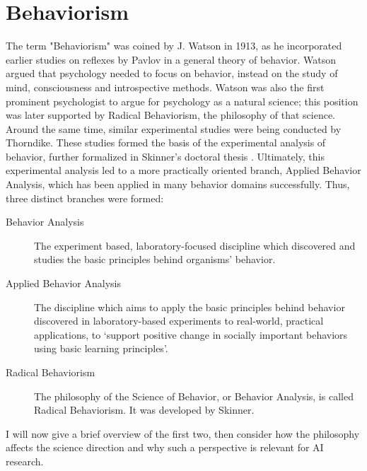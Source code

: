 \documentclass[letterpaper,11pt,twocolumn]{article}
\begin{document}
\section*{Behaviorism}
The term "Behaviorism" was coined by J. Watson in 1913\cite{maloneDidJohnWatson2014}, as he incorporated earlier studies on reflexes by Pavlov in a general theory of behavior. Watson argued that psychology needed to focus on behavior, instead on the study of mind, consciousness and introspective methods. Watson was also the first prominent psychologist to argue for psychology as a natural science; this position was later supported by Radical Behaviorism, the philosophy of that science. Around the same time, similar experimental studies were being conducted by Thorndike. These studies formed the basis of the experimental analysis of behavior, further formalized in Skinner's doctoral thesis \cite{skinnerBehaviorOrganismsExperimental1999}. Ultimately, this experimental analysis led to a more practically oriented branch, Applied Behavior Analysis, which has been applied in many behavior domains successfully\cite{wlABABehaviorScience2022}.
Thus, three distinct branches were formed:
\begin{description}
    \item[Behavior Analysis] The experiment based, laboratory-focused discipline which discovered and studies the basic principles behind organisms' behavior.
    \item[Applied Behavior Analysis] The discipline which aims to apply the basic principles behind behavior discovered in laboratory-based experiments to real-world, practical applications, to \enquote*{support positive change in socially important behaviors using basic learning principles}.
    \item[Radical Behaviorism] The philosophy of the Science of Behavior, or Behavior Analysis, is called Radical Behaviorism. It was developed by Skinner\cite{schneiderHistoryTermRadical1987}.
\end{description}

I will now give a brief overview of the first two, then consider how the philosophy affects the science direction and why such a perspective is relevant for AI research.
\end{document}
